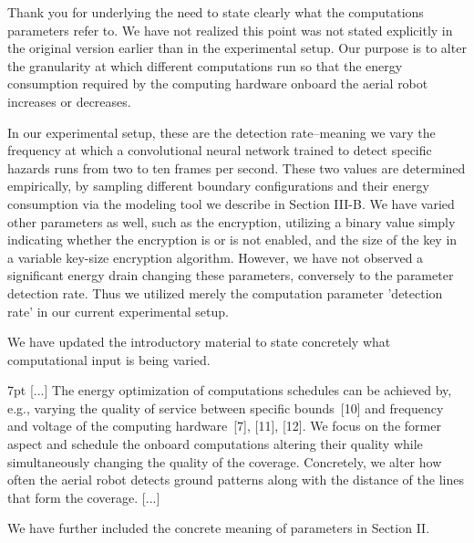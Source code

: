 \documentclass[10pt]{letter}
\newenvironment{formal}{%
  \def\FrameCommand{%
    \hspace{1pt}%
    {\color{red}\vrule width 2pt}%
    {\color{formalshade}\vrule width 4pt}%
    \colorbox{formalshade}%
  }%
  \MakeFramed{\advance\hsize-\width\FrameRestore}%
  \noindent\hspace{-4.55pt}%
  \begin{adjustwidth}{}{7pt}%
  \vspace{2pt}\vspace{2pt}%
}
{%
  \vspace{2pt}\end{adjustwidth}\endMakeFramed%
}
\begin{document}
  {\color{blue} 
  
  {\hspace*{-4.5em}{[R2:3]}\vspace*{-1.9em}}
  
  Thank you for underlying the need to state clearly what the computations parameters refer to. We have not realized this point was not stated explicitly in the original version earlier than in the experimental setup. Our purpose is to alter the granularity at which different computations run so that the energy consumption required by the computing hardware onboard the aerial robot increases or decreases.

  In our experimental setup, these are the detection rate--meaning we vary the frequency at which a convolutional neural network trained to detect specific hazards runs from two to ten frames per second. These two values are determined empirically, by sampling different boundary configurations and their energy consumption via the modeling tool we describe in Section III-B. We have varied other parameters as well, such as the encryption, utilizing a binary value simply indicating whether the encryption is or is not enabled, and the size of the key in a variable key-size encryption algorithm. However, we have not observed a significant energy drain changing these parameters, conversely to the parameter detection rate. Thus we utilized merely the computation parameter 'detection rate' in our current experimental setup. 

  We have updated the introductory material to state concretely what computational input is being varied.

  \begin{formal}\color{black}
    [...] The energy optimization of computations schedules can be achieved by, e.g., varying the quality of service between specific bounds~[{\color{green}10}] and frequency and voltage of the computing hardware~[{\color{green}7}], [{\color{green}11}], [{\color{green}12}]. We focus on the former aspect and schedule the onboard computations altering their quality while simultaneously changing the quality of the coverage.
    {\color{blue} Concretely, we alter how often the aerial robot detects ground patterns along with the distance of the lines that form the coverage.} [...]
    \vspace*{1ex}
  \end{formal}

  We have further included the concrete meaning of parameters in Section II.

}
\end{document}
